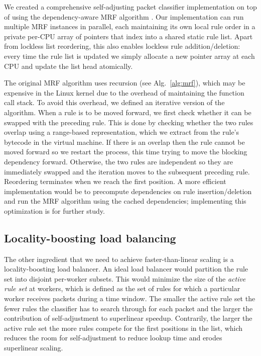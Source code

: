 We created a comprehensive self-adjusting packet classifier implementation on top of \nftables using the dependency-aware MRF algorithm \cite{10228937}. Our implementation can run multiple MRF instances in parallel, each maintaining its own local rule order in a private per-CPU array of pointers that index into a shared static rule list. Apart from lockless list reordering, this also enables lockless rule addition\slash deletion: every time the rule list is updated we simply allocate a new pointer array at each CPU and update the list head atomically.

The original MRF algorithm uses recursion (see Alg.~\ref{alg:mrf}), which may be expensive in the Linux kernel due to the overhead of maintaining the function call stack. To avoid this overhead, we defined an iterative version of the algorithm. When a rule is to be moved forward, we first check whether it can be swapped with the preceding rule. This is done by checking whether the two rules overlap using a range-based representation, which we extract from the rule's bytecode in the \nftables virtual machine. If there is an overlap then the rule cannot be moved forward so we restart the process, this time trying to move the blocking dependency forward. Otherwise, the two rules are independent so they are immediately swapped and the iteration moves to the subsequent preceding rule. Reordering terminates when we reach the first position. A more efficient implementation would be to precompute dependencies on rule insertion\slash deletion and run the MRF algorithm using the cached dependencies; implementing this optimization is for further study. %

\subsection{Locality-boosting load balancing}
\label{sec:sa-rss}

The other ingredient that we need to achieve faster-than-linear scaling is a locality-boosting load balancer.  An ideal load balancer would partition the rule set into disjoint per-worker subsets. This would minimize the size of the \emph{active rule set} at workers, which is defined as the set of rules for which a particular worker receives packets during a time window. The smaller the active rule set the fewer rules the classifier has to search through for each packet and the larger the contribution of self-adjustment to superlinear speedup. Contrarily, the larger the active rule set the more rules compete for the first positions in the list, which reduces the room for self-adjustment to reduce lookup time and erodes superlinear scaling.


